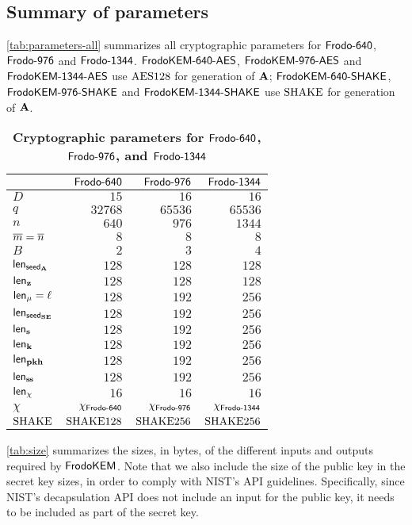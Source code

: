 \ifshoworiginal
\subsection{Summary of parameters}

\autoref{tab:parameters-all} summarizes all cryptographic parameters for $\FrodoLOne$, $\FrodoLThree$ and $\FrodoLFive$.  $\FrodoKEMLOneAES$, $\FrodoKEMLThreeAES$ and $\FrodoKEMLFiveAES$ use $\AESOneTwoEight$ for generation of $\bfA$; $\FrodoKEMLOneSHAKE$, $\FrodoKEMLThreeSHAKE$ and $\FrodoKEMLFiveSHAKE$ 
use $\SHAKE$ for generation of $\bfA$.

\begin{table}[h]
\caption{\textbf{Cryptographic parameters for $\FrodoLOne$, $\FrodoLThree$, and $\FrodoLFive$}}\label{tab:parameters-all}
\begin{center}
\begin{tabular}{l|r|r|r }
\toprule
& $\FrodoLOne$ & $\FrodoLThree$ & $\FrodoLFive$ \\
\midrule
$D$ & $15$ & $16$ & $16$ \\
$q$ & $32768$ & $65536$ & $65536$ \\
$n$ & $640$ & $976$ & $1344$ \\
$\mbar=\nbar$ & $8$ & $8$ & $8$ \\
$B$ & $2$ & $3$ & $4$ \\
$\lengthseedA$ & $128$ & $128$ & $128$ \\
$\lengthz$ & $128$ & $128$ & $128$ \\
$\lengthm = \ell$ & $128$ & $192$ & $256$ \\
$\lengthseedSE$ & $128$ & $192$ & $256$ \\
$\lengths$ & $128$ & $192$ & $256$ \\
$\lengthK$ & $128$ & $192$ & $256$ \\
$\lengthpkhash$ & $128$ & $192$ & $256$ \\
$\lengthss$ & $128$ & $192$ & $256$ \\
$\lengthchi$ & $16$ & $16$ & $16$ \\
$\chi$ & $\chi_\FrodoLOne$ & $\chi_\FrodoLThree$ & $\chi_\FrodoLFive$ \\
$\SHAKE$ & $\SHAKE128$ & $\SHAKE256$ & $\SHAKE256$ \\
\bottomrule
\end{tabular}
\end{center}
\end{table}

\autoref{tab:size} summarizes the sizes, in bytes, of the different
inputs and outputs required by
$\FrodoKEM$. %
Note that we also include the size of the public key in the secret key
sizes, in order to comply with NIST's API guidelines.  Specifically,
since NIST's decapsulation API does not include an input for the
public key, it needs to be included as part of the secret key.


